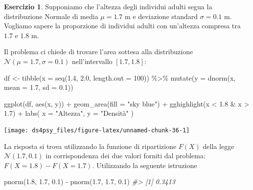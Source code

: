 \documentclass[
  11pt,
]{krantz}
\makeatletter
\newenvironment{Shaded}{\begin{snugshade}}{\end{snugshade}}
\newcommand{\AttributeTok}[1]{\textcolor[rgb]{0.61,0.61,0.61}{#1}}
\newcommand{\CommentTok}[1]{\textcolor[rgb]{0.37,0.37,0.37}{\textit{#1}}}
\newcommand{\DecValTok}[1]{\textcolor[rgb]{0.06,0.06,0.06}{#1}}
\newcommand{\FloatTok}[1]{\textcolor[rgb]{0.06,0.06,0.06}{#1}}
\newcommand{\FunctionTok}[1]{\textcolor[rgb]{0,0,0}{#1}}
\newcommand{\NormalTok}[1]{#1}
\newcommand{\OtherTok}[1]{\textcolor[rgb]{0.37,0.37,0.37}{#1}}
\newcommand{\SpecialCharTok}[1]{\textcolor[rgb]{0,0,0}{#1}}
\newcommand{\StringTok}[1]{\textcolor[rgb]{0.5,0.5,0.5}{#1}}
\newenvironment{kframe}{%
\medskip{}
\setlength{\fboxsep}{.8em}
 \def\at@end@of@kframe{}%
 \ifinner\ifhmode%
  \def\at@end@of@kframe{\end{minipage}}%
  \begin{minipage}{\columnwidth}%
 \fi\fi%
 \def\FrameCommand##1{\hskip\@totalleftmargin \hskip-\fboxsep
 \colorbox{shadecolor}{##1}\hskip-\fboxsep
     \hskip-\linewidth \hskip-\@totalleftmargin \hskip\columnwidth}%
 \MakeFramed {\advance\hsize-\width
   \@totalleftmargin\z@ \linewidth\hsize
   \@setminipage}}%
 {\par\unskip\endMakeFramed%
 \at@end@of@kframe}
\renewenvironment{Shaded}{\begin{kframe}}{\end{kframe}}
\theoremstyle{definition}
\theoremstyle{definition}
\theoremstyle{definition}
\newtheorem{exercise}{Esercizio}[chapter]
\theoremstyle{definition}
\theoremstyle{remark}
\makeatother
\begin{document}
\begin{exercise}
Supponiamo che l'altezza degli individui adulti segua la distribuzione Normale di media \(\mu = 1.7\) m e deviazione standard \(\sigma = 0.1\) m. Vogliamo sapere la proporzione di individui adulti con un'altezza compresa tra \(1.7\) e \(1.8\) m.

Il problema ci chiede di trovare l'area sottesa alla distribuzione \(\mathcal{N}(\mu = 1.7, \sigma = 0.1)\) nell'intervallo \([1.7, 1.8]\):

\begin{Shaded}
\begin{Highlighting}[]
\NormalTok{df }\OtherTok{\textless{}{-}} \FunctionTok{tibble}\NormalTok{(}\AttributeTok{x =} \FunctionTok{seq}\NormalTok{(}\FloatTok{1.4}\NormalTok{, }\FloatTok{2.0}\NormalTok{, }\AttributeTok{length.out =} \DecValTok{100}\NormalTok{)) }\SpecialCharTok{\%\textgreater{}\%}
  \FunctionTok{mutate}\NormalTok{(}\AttributeTok{y =} \FunctionTok{dnorm}\NormalTok{(x, }\AttributeTok{mean =} \FloatTok{1.7}\NormalTok{, }\AttributeTok{sd =} \FloatTok{0.1}\NormalTok{))}

\FunctionTok{ggplot}\NormalTok{(df, }\FunctionTok{aes}\NormalTok{(x, y)) }\SpecialCharTok{+}
  \FunctionTok{geom\_area}\NormalTok{(}\AttributeTok{fill =} \StringTok{"sky blue"}\NormalTok{) }\SpecialCharTok{+}
  \FunctionTok{gghighlight}\NormalTok{(x }\SpecialCharTok{\textless{}} \FloatTok{1.8} \SpecialCharTok{\&}\NormalTok{ x }\SpecialCharTok{\textgreater{}} \FloatTok{1.7}\NormalTok{) }\SpecialCharTok{+}
  \FunctionTok{labs}\NormalTok{(}
    \AttributeTok{x =} \StringTok{"Altezza"}\NormalTok{,}
    \AttributeTok{y =} \StringTok{"Densità"}
\NormalTok{  )}
\end{Highlighting}
\end{Shaded}

\begin{center}\texttt{[image: ds4psy\_files/figure-latex/unnamed-chunk-36-1]} \end{center}

\noindent La risposta si trova utilizzando la funzione di ripartizione \(F(X)\) della legge \(\mathcal{N}(1.7, 0.1)\) in corrispondenza dei due valori forniti dal problema: \(F(X = 1.8) - F(X = 1.7)\). Utilizzando la seguente istruzione

\begin{Shaded}
\begin{Highlighting}[]
\FunctionTok{pnorm}\NormalTok{(}\FloatTok{1.8}\NormalTok{, }\FloatTok{1.7}\NormalTok{, }\FloatTok{0.1}\NormalTok{) }\SpecialCharTok{{-}} \FunctionTok{pnorm}\NormalTok{(}\FloatTok{1.7}\NormalTok{, }\FloatTok{1.7}\NormalTok{, }\FloatTok{0.1}\NormalTok{)}
\CommentTok{\#\textgreater{} [1] 0.3413}
\end{Highlighting}
\end{Shaded}


\end{exercise}
\end{document}
